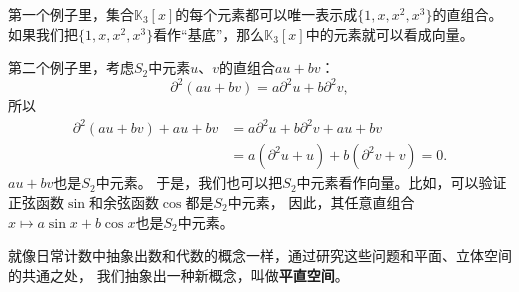 \documentclass[12pt,UTF8]{ctexbook}
\begin{document}
第一个例子里，集合$\mathbb{K}_3[x]$的每个元素都可以唯一表示成$\{1, x, x^2, x^3\}$的直组合。
如果我们把$\{1, x, x^2, x^3\}$看作“基底”，那么$\mathbb{K}_3[x]$中的元素就可以看成向量。

第二个例子里，考虑$S_2$中元素$u$、$v$的直组合$au + bv$：
$$ \partial^2 (au + bv) = a \partial^2 u + b \partial^2 v,$$
所以
\begin{align*}
    \partial^2 (au + bv) + au + bv &= a \partial^2 u + b \partial^2 v + au + bv  \\
    &= a(\partial^2 u + u) + b(\partial^2 v + v) = 0.  
\end{align*}
$au + bv$也是$S_2$中元素。
于是，我们也可以把$S_2$中元素看作向量。比如，可以验证正弦函数$\sin$和余弦函数$\cos$都是$S_2$中元素，
因此，其任意直组合$x\mapsto a\sin{x} + b\cos{x}$也是$S_2$中元素。

就像日常计数中抽象出数和代数的概念一样，通过研究这些问题和平面、立体空间的共通之处，
我们抽象出一种新概念，叫做\textbf{平直空间}。
\end{document}
